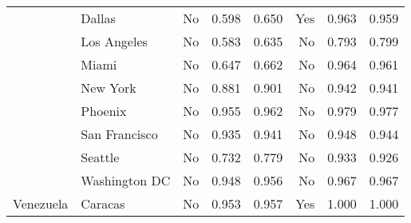 \begin{tabular}{ l l r r r r r r  }
          & Dallas &       No &  0.598 &  0.650 &      Yes &  0.963 &  0.959 \\
          & Los Angeles &       No &  0.583 &  0.635 &       No &  0.793 &  0.799 \\
          & Miami &       No &  0.647 &  0.662 &       No &  0.964 &  0.961 \\
          & New York &       No &  0.881 &  0.901 &       No &  0.942 &  0.941 \\
          & Phoenix &       No &  0.955 &  0.962 &       No &  0.979 &  0.977 \\
          & San Francisco &       No &  0.935 &  0.941 &       No &  0.948 &  0.944 \\
          & Seattle &       No &  0.732 &  0.779 &       No &  0.933 &  0.926 \\
          & Washington DC &       No &  0.948 &  0.956 &       No &  0.967 &  0.967 \\
Venezuela & Caracas &       No &  0.953 &  0.957 &      Yes &  1.000 &  1.000 \\
\bottomrule
\end{tabular}